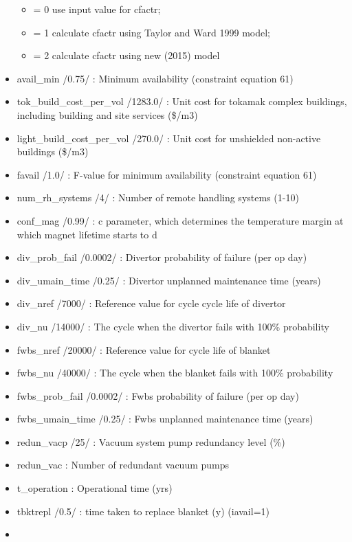 \documentclass[]{article}
\providecommand{\tightlist}{%
  \setlength{\itemsep}{0pt}\setlength{\parskip}{0pt}}
\begin{document}
\begin{itemize}
  \begin{itemize}
  \tightlist
  \item
    = 0 use input value for cfactr;
  \item
    = 1 calculate cfactr using Taylor and Ward 1999 model;
  \item
    = 2 calculate cfactr using new (2015) model
  \end{itemize}
\item
  avail\_min /0.75/ : Minimum availability (constraint equation 61)
\item
  tok\_build\_cost\_per\_vol /1283.0/ : Unit cost for tokamak complex
  buildings, including building and site services (\$/m3)
\item
  light\_build\_cost\_per\_vol /270.0/ : Unit cost for unshielded
  non-active buildings (\$/m3)
\item
  favail /1.0/ : F-value for minimum availability (constraint equation
  61)
\item
  num\_rh\_systems /4/ : Number of remote handling systems (1-10)
\item
  conf\_mag /0.99/ : c parameter, which determines the temperature
  margin at which magnet lifetime starts to d
\item
  div\_prob\_fail /0.0002/ : Divertor probability of failure (per op
  day)
\item
  div\_umain\_time /0.25/ : Divertor unplanned maintenance time (years)
\item
  div\_nref /7000/ : Reference value for cycle cycle life of divertor
\item
  div\_nu /14000/ : The cycle when the divertor fails with 100\%
  probability
\item
  fwbs\_nref /20000/ : Reference value for cycle life of blanket
\item
  fwbs\_nu /40000/ : The cycle when the blanket fails with 100\%
  probability
\item
  fwbs\_prob\_fail /0.0002/ : Fwbs probability of failure (per op day)
\item
  fwbs\_umain\_time /0.25/ : Fwbs unplanned maintenance time (years)
\item
  redun\_vacp /25/ : Vacuum system pump redundancy level (\%)
\item
  redun\_vac : Number of redundant vacuum pumps
\item
  t\_operation : Operational time (yrs)
\item
  tbktrepl /0.5/ : time taken to replace blanket (y) (iavail=1)
\item

\end{itemize}
\end{document}

